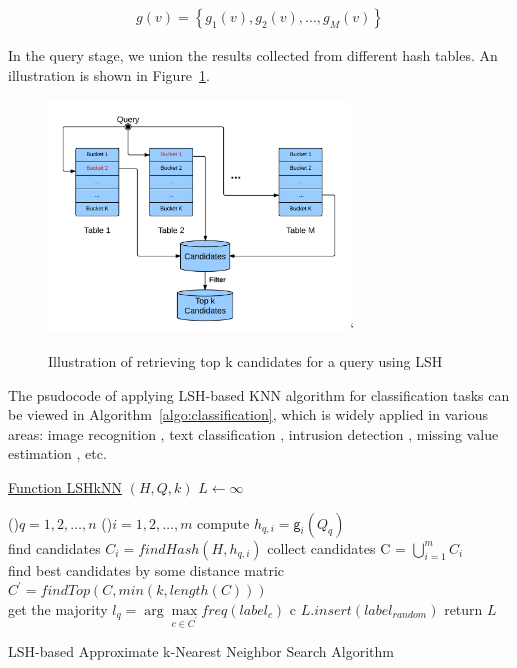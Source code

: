 \documentclass[letterpaper,twocolumn,10pt]{article}
\theoremstyle{definition}
\begin{document}
\begin{align*}
g(v) = \left\{g_1(v), g_2(v), ..., g_M(v)\right\}
\end{align*}

In the query stage, we union the results 
collected from different hash tables. An illustration is shown in Figure~\ref{figure:topk-illustration}.

\begin{figure}[t]
	\center
	\includegraphics[width=8cm]{graph.png}`
	\vspace{-0.5cm}
	\caption{Illustration of retrieving top k candidates for a query using LSH}
	\label{figure:topk-illustration}
	\vspace{-1cm}
\end{figure}

The psudocode of applying LSH-based KNN algorithm
for classification tasks can be viewed in Algorithm~\ref{algo:classification}, which is widely applied in 
various areas: 
image recognition \cite{lee1991handwritten}, text classification \cite{tan2006effective}, intrusion 
detection \cite{liao2002use}, missing value estimation \cite{acuna2004treatment},  etc. 

\begin{algorithm}[h]
	\underline{Function LSHkNN} $(H, Q, k)$\;
	$L \leftarrow \infty$
	
	\For(){$q=1, 2, \ldots, n$ }{
		\For(){$i=1, 2, \ldots, m$}{        
			compute $h_{q, i} = \mathsf{g}_i(Q_q)$ \\
			find candidates $C_i = findHash(H, h_{q, i})$
		}
		collect candidates C = $\bigcup\limits_{i=1}^{m} C_{i}$ \\

		{
			find best candidates by some distance matric $C^{\prime} = findTop(C, min(k, length(C)))$ \\
			get the majority $l_q = \arg \max\limits_{c \in C^{\prime}} freq(label_c)$
			c
		}
		{
			$L.insert(label_{random})$
		}
	}
	return $L$\;
		
	\caption{LSH-based Approximate k-Nearest Neighbor Search Algorithm}
	\label{algo:classification}
\end{algorithm}
\end{document}
